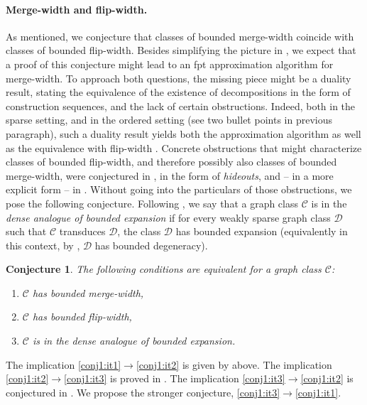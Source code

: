 \documentclass[11pt]{article}
\newtheorem{conjecture}[theorem]{Conjecture}
\theoremstyle{remark}
\def\cal{\mathcal}
\newcommand{\CC}{\cal C}
\newcommand{\DD}{\cal D}
\begin{document}
 \paragraph{Merge-width and flip-width.}
As mentioned, we conjecture that classes of bounded merge-width coincide with classes of bounded flip-width. Besides simplifying the picture in , we expect that a proof of this conjecture might lead to an fpt approximation algorithm for merge-width. To approach  both questions, the missing piece might be a duality result, stating the equivalence of the existence of decompositions in the form of construction sequences, and the lack of certain obstructions.
Indeed, both in the sparse setting, and in the ordered setting (see two bullet points in previous paragraph), such a duality result yields both the approximation algorithm as well as the equivalence with flip-width \cite{flip-width}.
Concrete obstructions that might characterize classes of bounded flip-width, and therefore possibly also classes of bounded merge-width, were conjectured in
\cite{flip-width}, in the form of \emph{hideouts},
and -- in a more explicit form -- in \cite[Sec. 4]{flip-breakability}.
Without going into the particulars of those obstructions, we pose the following conjecture.
Following \cite{tww-types-icalp}, we say that a graph class $\CC$ is in the \emph{dense analogue of bounded expansion} if
 for every weakly sparse graph class $\DD$ such that $\CC$ transduces $\DD$,
 the class $\DD$ has bounded expansion (equivalently in this context, by \cite{Dvorak18}, $\DD$ has bounded degeneracy).


\begin{conjecture}\label{conj:bmw}The following conditions are equivalent for a graph class $\CC$:
  \begin{enumerate}
    \item\label{conj1:it1} $\CC$ has bounded merge-width,
    \item\label{conj1:it2} $\CC$ has bounded flip-width,
    \item\label{conj1:it3} $\CC$ is in the dense analogue of bounded expansion.
  \end{enumerate}
\end{conjecture}
The implication \eqref{conj1:it1}$\rightarrow$\eqref{conj1:it2} is given by  above.
The implication \eqref{conj1:it2}$\rightarrow$\eqref{conj1:it3} is proved in \cite[Thm. VI.3]{flip-width}.
The implication \eqref{conj1:it3}$\rightarrow$\eqref{conj1:it2} is conjectured in \cite[Conj. XI.7.]{flip-width}.
We propose the stronger conjecture, \eqref{conj1:it3}$\rightarrow$\eqref{conj1:it1}.
\end{document}
